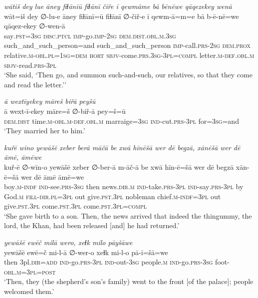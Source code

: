 \ea \label{KŠ.86}
\textit{wātiš dey lue āney fiɫānīū fiɫānī čiře ī qewmāme bā bēnēwe qāqezekey wenā} \\ 
\gll wāt=iš dey ∅-lu-e āney fiɫānī=ū fiɫānī ∅-čiř-e ī qewm-ā=m=e bā b-ē-nē=we qāqez-ekey ∅-wen-ā \\ 
 say\textsc{.pst}\textsc{=3sg} \textsc{disc.ptcl} \textsc{imp-}go.\textsc{imp-}\textsc{2sg} \textsc{dem.dist}\textsc{.obl}\textsc{.m}\textsc{.3sg} such\_and\_such\_person=and such\_and\_such\_person \textsc{imp-}call\textsc{.prs}-\textsc{2sg} \textsc{dem.prox} relative\textsc{.m}\textsc{-obl}\textsc{.pl}\textsc{=\textsc{1sg}}\textsc{=dem} \textsc{hort} \textsc{sbjv-}come\textsc{.prs}\textsc{.3sg}\textsc{-3pl}\textsc{=compl} letter\textsc{.m}\textsc{-def}\textsc{.obl}\textsc{.m} \textsc{sbjv-}read\textsc{.prs}\textsc{-3pl} \\ 
\glt `She said, ‘Then go, and summon such-and-such, our relatives, so that they come and read the letter.’'
\z 
 
\ea \label{KŠ.89}
\textit{ā wextīyekey māreš biřā peyšū} \\ 
\gll ā wext-ī-ekey māre=š ∅-biř-ā pey=š=ū \\ 
 \textsc{dem.dist} time\textsc{.m}\textsc{-obl}\textsc{.m}\textsc{-def}\textsc{.obl}\textsc{.m} marraige\textsc{=3sg} \textsc{ind-}cut\textsc{.prs}\textsc{-3pl} for\textsc{=3sg}=and \\ 
\glt `They married her to him.'
\z 
 
\ea \label{KŠ.93}
\textit{kuřē wīno yewāšē xeber berā māčā be xwā hīnēšā wer dē begzā, xānēšā wer dē āmē, āmēwe} \\ 
\gll kuř-ē ∅-wīn-o yewāšē xeber ∅-ber-ā m-āč-ā be xwā hīn-ē=šā wer dē begzā xān-ē=šā wer dē āmē āmē=we \\ 
 boy\textsc{.m}\textsc{-indf} \textsc{ind-}see\textsc{.prs}\textsc{-3sg} then news\textsc{.dir}\textsc{.m} \textsc{ind-}take\textsc{.prs}\textsc{-3pl} \textsc{ind-}say\textsc{.prs}\textsc{-3pl} by God\textsc{.m} \textsc{fill}\textsc{-dir}\textsc{.pl}\textsc{=3pl} out give\textsc{.pst}\textsc{.3pl} nobleman chief\textsc{.m}\textsc{-indf}\textsc{=3pl} out give\textsc{.pst}\textsc{.3pl} come\textsc{.pst}\textsc{.3pl} come\textsc{.pst}\textsc{.3pl}\textsc{=compl} \\ 
\glt `She gave birth to a son. Then, the news arrived that indeed the thingummy, the lord, the Khan, had been released [and] he had returned.'
\z 
 
\ea \label{KŠ.94}
\textit{yewāšē ewēč milā wero, xeɫk milo pāyšāwe} \\ 
\gll yewāšē ewē=č mi-l-ā ∅-wer-o xeɫk mi-l-o pā-ī=šā=we \\ 
 then 3pl\textsc{.dir}\textsc{=add} \textsc{ind-}go\textsc{.prs}\textsc{-3pl} \textsc{ind-}out\textsc{-3sg} people\textsc{.m} \textsc{ind-}go\textsc{.prs}\textsc{-3sg} foot\textsc{-obl}\textsc{.m}\textsc{=3pl}\textsc{=\textsc{post}} \\ 
\glt `Then, they (the shepherd’s son’s family) went to the front [of the palace]; people welcomed them.'
\z 
 
